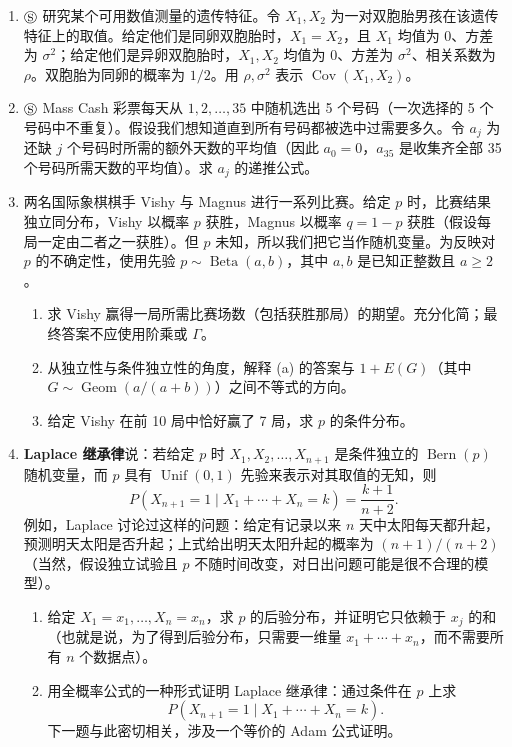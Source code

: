 \documentclass[UTF8, 12pt, fontset=fandol, oneside]{ctexart}
\begin{document}
\begin{enumerate}
  \item $\circledS$ 研究某个可用数值测量的遗传特征。令 $X_1,X_2$ 为一对双胞胎男孩在该遗传特征上的取值。给定他们是同卵双胞胎时，$X_1=X_2$，且 $X_1$ 均值为 $0$、方差为 $\sigma^2$；给定他们是异卵双胞胎时，$X_1,X_2$ 均值为 $0$、方差为 $\sigma^2$、相关系数为 $\rho$。双胞胎为同卵的概率为 $1/2$。用 $\rho,\sigma^2$ 表示 $\operatorname{Cov}(X_1,X_2)$。

  \item $\circledS$ Mass Cash 彩票每天从 $1,2,\ldots,35$ 中随机选出 5 个号码（一次选择的 5 个号码中不重复）。假设我们想知道直到所有号码都被选中过需要多久。令 $a_j$ 为还缺 $j$ 个号码时所需的额外天数的平均值（因此 $a_0=0$，$a_{35}$ 是收集齐全部 35 个号码所需天数的平均值）。求 $a_j$ 的递推公式。

  \item 两名国际象棋棋手 Vishy 与 Magnus 进行一系列比赛。给定 $p$ 时，比赛结果独立同分布，Vishy 以概率 $p$ 获胜，Magnus 以概率 $q=1-p$ 获胜（假设每局一定由二者之一获胜）。但 $p$ 未知，所以我们把它当作随机变量。为反映对 $p$ 的不确定性，使用先验 $p\sim\operatorname{Beta}(a,b)$，其中 $a,b$ 是已知正整数且 $a\ge2$。
  \begin{enumerate}
    \item[(a)] 求 Vishy 赢得一局所需比赛场数（包括获胜那局）的期望。充分化简；最终答案不应使用阶乘或 $\Gamma$。
    \item[(b)] 从独立性与条件独立性的角度，解释 (a) 的答案与 $1+E(G)$（其中 $G\sim\operatorname{Geom}(a/(a+b))$）之间不等式的方向。
    \item[(c)] 给定 Vishy 在前 10 局中恰好赢了 7 局，求 $p$ 的条件分布。
  \end{enumerate}

  \item \textbf{Laplace 继承律}说：若给定 $p$ 时 $X_1,X_2,\ldots,X_{n+1}$ 是条件独立的 $\operatorname{Bern}(p)$ 随机变量，而 $p$ 具有 $\operatorname{Unif}(0,1)$ 先验来表示对其取值的无知，则
  \[
    P(X_{n+1}=1\mid X_1+\cdots+X_n=k)=\frac{k+1}{n+2}.
  \]
  例如，Laplace 讨论过这样的问题：给定有记录以来 $n$ 天中太阳每天都升起，预测明天太阳是否升起；上式给出明天太阳升起的概率为 $(n+1)/(n+2)$（当然，假设独立试验且 $p$ 不随时间改变，对日出问题可能是很不合理的模型）。
  \begin{enumerate}
    \item[(a)] 给定 $X_1=x_1,\ldots,X_n=x_n$，求 $p$ 的后验分布，并证明它只依赖于 $x_j$ 的和（也就是说，为了得到后验分布，只需要一维量 $x_1+\cdots+x_n$，而不需要所有 $n$ 个数据点）。
    \item[(b)] 用全概率公式的一种形式证明 Laplace 继承律：通过条件在 $p$ 上求
    \[
      P(X_{n+1}=1\mid X_1+\cdots+X_n=k).
    \]
    下一题与此密切相关，涉及一个等价的 Adam 公式证明。
  \end{enumerate}


\end{enumerate}
\end{document}

